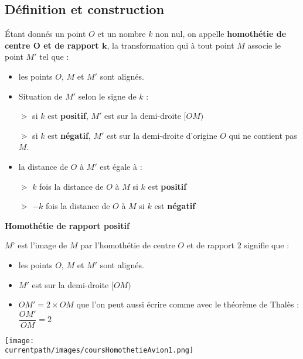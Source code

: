 \subsection{Définition et construction}
\begin{definition}
    Étant donnés un point $O$ et un nombre $k$ non nul, on appelle \textbf{homothétie de centre $\mathbf{O}$ et de rapport $\mathbf{k}$}, la transformation qui à tout point $M$ associe le point $M'$ tel que :
    \begin{itemize}
        \item les points $O$, $M$ et $M'$ sont alignés.
        \item Situation de $M'$ selon le signe de $k$ :
        
        \hspace*{1cm}$\gtrdot$ si $k$ est \textbf{positif}, $M'$ est sur la demi-droite $[OM)$

        \hspace*{1cm}$\gtrdot$ si $k$ est \textbf{négatif}, $M'$ est sur la demi-droite d'origine $O$ qui ne contient pas $M$.
        \item la distance de $O$ à $M'$ est égale à :
        
        \hspace*{1cm}$\gtrdot$ $k$ fois la distance de $O$ à $M$ si $k$ est \textbf{positif}

        \hspace*{1cm}$\gtrdot$ $-k$ fois la distance de $O$ à $M$ si $k$ est \textbf{négatif}
    \end{itemize}
\end{definition}

\begin{exemple*1}
    {\color{red}\bfseries Homothétie de rapport positif}

    $M’$ est l’image de $M$ par l’homothétie de centre $O$ et de rapport $2$ signifie que :
    \begin{itemize}
        \item les points $O$, $M$ et $M'$ sont alignés.
        \item $M'$ est sur la demi-droite $[OM)$
        \item $OM'=2\times OM$ que l'on peut aussi écrire comme avec le théorème de Thalès : $\dfrac{OM'}{OM}=2$
    \end{itemize}
    \begin{center}
        \texttt{[image: \\currentpath/images/coursHomothetieAvion1.png]} 
    \end{center}
\end{exemple*1}

